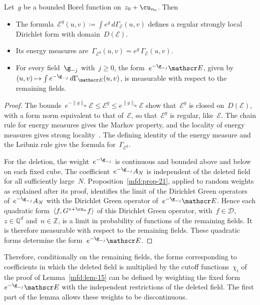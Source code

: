 \documentclass[11pt]{amsart}
\begin{document}
\begin{lemma}
\label{mfd:lem-borel-weights}
Let~$g$ be a bounded Borel function on~$z_0+\cu_{n_0}$. Then
\begin{itemize}
\item The formula~$\mathscr E^g(u,v)\coloneqq\int e^g\,d\Gamma_{\mathscr E}(u,v)$ defines a regular strongly local Dirichlet form with domain~$D(\mathscr E)$.
\item Its energy measures are~$\Gamma_{\mathscr E^g}(u,v)=e^g\,\Gamma_{\mathscr E}(u,v)$.
\item For every field~$\g_{-j}$ with~$j\geq0$, the form~$e^{-\g_{-j}}\mathscr E$, given by~$(u,v)\mapsto\int e^{-\g_{-j}}\,d\Gamma_{\mathscr E}(u,v)$, is measurable with respect to the remaining fields.
\end{itemize}
\end{lemma}

\begin{proof}
The bounds~$e^{-\|g\|_\infty}\mathscr E\leq \mathscr E^g\leq e^{\|g\|_\infty}\mathscr E$ show that~$\mathscr E^g$ is closed on~$D(\mathscr E)$, with a form norm equivalent to that of~$\mathscr E$, so that~$\mathscr E^g$ is regular, like~$\mathscr E$. The chain rule for energy measures gives the Markov property, and the locality of energy measures gives strong locality~\citep[Theorem~3.2.2 and Lemma~3.2.5]{FOT}. The defining identity of the energy measure and the Leibniz rule give the formula for~$\Gamma_{\mathscr E^g}$.

\smallskip

For the deletion, the weight~$e^{-\g_{-j}}$ is continuous and bounded above and below on each fixed cube. The coefficient~$e^{-\g_{-j}}A_N$ is independent of the deleted field for all sufficiently large~$N$. Proposition~\ref{mfd:prop-21}, applied to random weights as explained after its proof, identifies the limit of the Dirichlet Green operators of~$e^{-\g_{-j}}A_N$ with the Dirichlet Green operator of~$e^{-\g_{-j}}\mathscr E$. Hence each quadratic form~$\langle f,G^{z+\cu_n}f\rangle$ of this Dirichlet Green operator, with~$f\in\mathcal D$,~$z\in\mathbb Q^d$ and~$n\in\mathbb Z$, is a limit in probability of functions of the remaining fields. It is therefore measurable with respect to the remaining fields. These quadratic forms determine the form~$e^{-\g_{-j}}\mathscr E$.
\end{proof}

Therefore, conditionally on the remaining fields, the forms corresponding to coefficients in which the deleted field is multiplied by the cutoff functions~$\chi_i$ of the proof of Lemma~\ref{mfd:lem-15} can be defined by weighting the fixed form~$e^{-\g_{-j}}\mathscr E$ with the independent restrictions of the deleted field. The first part of the lemma allows these weights to be discontinuous.
\end{document}
